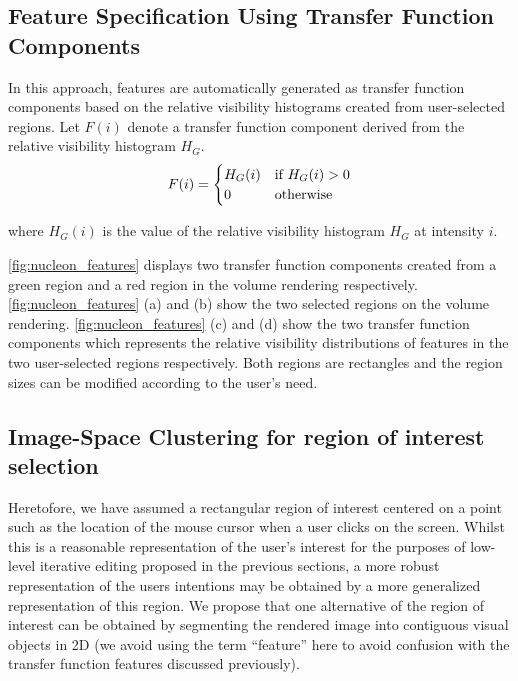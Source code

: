 \documentclass[twoside,twocolumn,10pt]{article}
\begin{document}


\subsection{Feature Specification Using Transfer Function Components}
In this approach, features are automatically generated as transfer function components based on the relative visibility histograms created from user-selected regions.
Let $F(i)$ denote a transfer function component derived from the relative visibility histogram $H_{G}$.
\[
F(i) =
\begin{cases}
H_{G}(i) & \text{if $ H_{G}(i)>0 $} \\
0 & \text{otherwise}
\end{cases}
\]

where $ H_{G}(i) $ is the value of the relative visibility histogram $ H_{G} $ at intensity $ i $.

\autoref{fig:nucleon_features} displays two transfer function components created from a green region and a red region in the volume rendering respectively.
\autoref{fig:nucleon_features} (a) and (b) show the two selected regions on the volume rendering. \autoref{fig:nucleon_features} (c) and (d) show the two transfer function components which represents the relative visibility distributions of features in the two user-selected regions respectively. Both regions are rectangles and the region sizes can be modified according to the user's need.

\subsection{Image-Space Clustering for region of interest selection}




Heretofore, we have assumed a rectangular region of interest centered on a point such as the location of the mouse cursor when a user clicks on the screen. Whilst this is a reasonable representation of the user's interest for the purposes of low-level iterative editing proposed in the previous sections, a more robust representation of the users intentions may be obtained by a more generalized representation of this region. We propose that one alternative of the region of interest can be obtained by segmenting the rendered image into contiguous visual objects in 2D (we avoid using the term ``feature'' here to avoid confusion with the transfer function features discussed previously).
\end{document}
